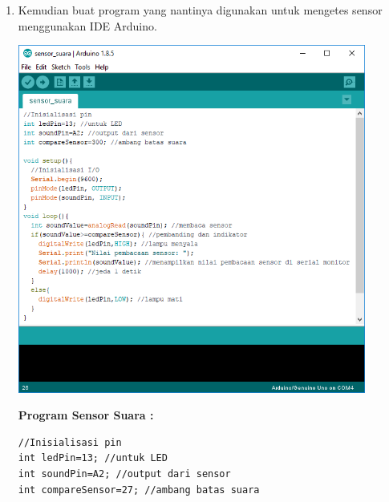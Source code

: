 \begin{enumerate}
\item  Kemudian buat program yang nantinya digunakan untuk mengetes sensor menggunakan IDE Arduino.
\break\\
\centerline{\includegraphics[width=0.9\textwidth]{figures/ss10.png}}
\break \textbf{Program Sensor Suara :}
\begin{verbatim}
//Inisialisasi pin
int ledPin=13; //untuk LED
int soundPin=A2; //output dari sensor
int compareSensor=27; //ambang batas suara


\end{verbatim}
\end{enumerate}
